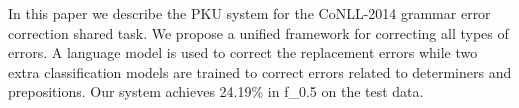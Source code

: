 In this paper we describe the PKU system for the CoNLL-2014 grammar error correction shared task. We propose a unified framework for correcting all types of errors. A language model is used to correct the replacement errors while two extra classification models are trained to correct errors related to determiners and prepositions. Our system achieves 24.19\% in f\_0.5 on the test data.
